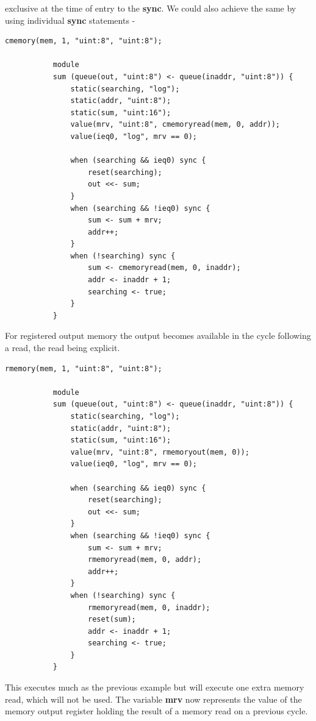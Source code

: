         exclusive at the time of entry to the {\bf sync}. We could also
        achieve the same by using individual {\bf sync} statements -
        \begin{lstlisting}[gobble=8, language=threepl]
           cmemory(mem, 1, "uint:8", "uint:8");

           module
           sum (queue(out, "uint:8") <- queue(inaddr, "uint:8")) {
               static(searching, "log");
               static(addr, "uint:8");
               static(sum, "uint:16");
               value(mrv, "uint:8", cmemoryread(mem, 0, addr));
               value(ieq0, "log", mrv == 0);

               when (searching && ieq0) sync {
                   reset(searching);
                   out <<- sum;
               }
               when (searching && !ieq0) sync {
                   sum <- sum + mrv;
                   addr++;
               }
               when (!searching) sync {
                   sum <- cmemoryread(mem, 0, inaddr);
                   addr <- inaddr + 1;
                   searching <- true;
               }
           }
        \end{lstlisting}

        For registered output memory the output becomes available in the cycle
        following a read, the read being explicit.
        \begin{lstlisting}[gobble=8, language=threepl]
           rmemory(mem, 1, "uint:8", "uint:8");

           module
           sum (queue(out, "uint:8") <- queue(inaddr, "uint:8")) {
               static(searching, "log");
               static(addr, "uint:8");
               static(sum, "uint:16");
               value(mrv, "uint:8", rmemoryout(mem, 0));
               value(ieq0, "log", mrv == 0);

               when (searching && ieq0) sync {
                   reset(searching);
                   out <<- sum;
               }
               when (searching && !ieq0) sync {
                   sum <- sum + mrv;
                   rmemoryread(mem, 0, addr);
                   addr++;
               }
               when (!searching) sync {
                   rmemoryread(mem, 0, inaddr);
                   reset(sum);
                   addr <- inaddr + 1;
                   searching <- true;
               }
           }
        \end{lstlisting}
        This executes much as the previous example but will execute one extra
        memory read, which will not be used. The variable {\bf mrv} now
        represents the value of the memory output register holding the result of
        a memory read on a previous cycle.
        
